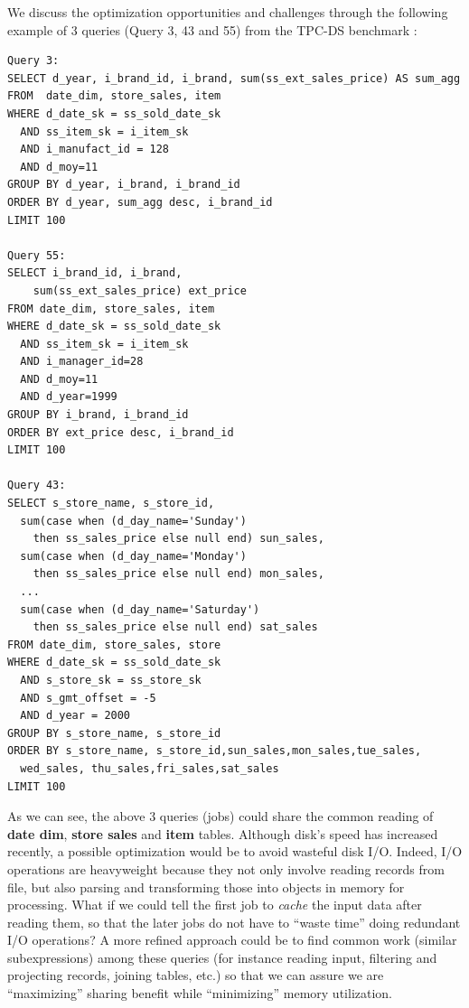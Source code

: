 


We discuss the optimization opportunities and challenges through the following example of 3 queries (Query 3, 43 and 55) from the TPC-DS benchmark \cite{tpcds}:
\begingroup
\fontsize{6pt}{7pt}
\selectfont
\begin{verbatim}
Query 3:
SELECT d_year, i_brand_id, i_brand, sum(ss_ext_sales_price) AS sum_agg
FROM  date_dim, store_sales, item
WHERE d_date_sk = ss_sold_date_sk
  AND ss_item_sk = i_item_sk
  AND i_manufact_id = 128
  AND d_moy=11
GROUP BY d_year, i_brand, i_brand_id
ORDER BY d_year, sum_agg desc, i_brand_id
LIMIT 100

Query 55:
SELECT i_brand_id, i_brand, 
	sum(ss_ext_sales_price) ext_price
FROM date_dim, store_sales, item
WHERE d_date_sk = ss_sold_date_sk
  AND ss_item_sk = i_item_sk
  AND i_manager_id=28
  AND d_moy=11
  AND d_year=1999
GROUP BY i_brand, i_brand_id
ORDER BY ext_price desc, i_brand_id
LIMIT 100

Query 43:
SELECT s_store_name, s_store_id, 
  sum(case when (d_day_name='Sunday') 
    then ss_sales_price else null end) sun_sales,
  sum(case when (d_day_name='Monday') 
    then ss_sales_price else null end) mon_sales,
  ...
  sum(case when (d_day_name='Saturday') 
    then ss_sales_price else null end) sat_sales
FROM date_dim, store_sales, store
WHERE d_date_sk = ss_sold_date_sk 
  AND s_store_sk = ss_store_sk
  AND s_gmt_offset = -5
  AND d_year = 2000
GROUP BY s_store_name, s_store_id
ORDER BY s_store_name, s_store_id,sun_sales,mon_sales,tue_sales,
  wed_sales, thu_sales,fri_sales,sat_sales
LIMIT 100
\end{verbatim}
\endgroup

As we can see, the above 3 queries (jobs) could share the common reading of \textbf{date dim}, \textbf{store sales} and \textbf{item} tables. Although disk's speed has increased recently, a possible optimization would be to avoid wasteful disk I/O. Indeed, I/O operations are heavyweight because they not only involve reading records from file, but also parsing and transforming those into objects in memory for processing. What if we could tell the first job to \emph{cache} the input data after reading them, so that the later jobs do not have to ``waste time'' doing redundant I/O operations? A more refined approach could be to find common work (similar subexpressions) among these queries (for instance reading input, filtering and projecting records, joining tables, etc.) so that we can assure we are ``maximizing'' sharing benefit while ``minimizing'' memory utilization.

